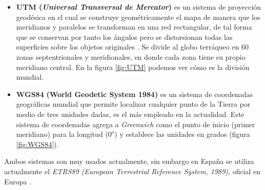 \begin{itemize}
	\item \textbf{UTM (\textit{Universal Transversal de Mercator})} es un sistema de proyección geodésica en el cual se construye geométricamente el mapa de manera que los meridianos y paralelos se transforman en una red rectangular, de tal forma que se conservan por tanto los ángulos pero se distorsionan todas las superficies sobre los objetos originales \cite{utm-nuevo}. Se divide al globo terráqueo en 60 zonas septentrionales y meridionales, en donde cada zona tiene su propio meridiano central. En la figura \ref{fig:UTM} podemos ver cómo es la división mundial.
	
	\item \textbf{WGS84} \textbf{(World Geodetic System 1984)} es un sistema de coordenadas geográficas mundial que permite localizar cualquier punto de la Tierra por medio de tres unidades dadas, es el más empleado en la actualidad. Este sistema de coordenadas agrega a \textit{Greenwich} como el punto de inicio (primer meridiano) para la longitud ($0^o$) y establece las unidades en grados \cite{VictorOlaya} (figura \ref{fig:WGS84}).
\end{itemize}

Ambos sistemas son muy usados actualmente, sin embargo en España se utiliza actualmente el \textit{ETRS89 (European Terrestrial Reference System, 1989)}, oficial en Europa \cite{AsignaturaSIG}.\\ 

